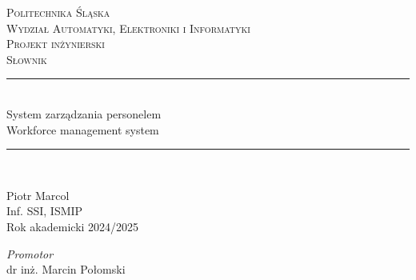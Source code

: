 \begin{titlepage} %

    \newcommand{\HRule}{\rule{\linewidth}{0.5mm}} %

    \center %


    \textsc{\LARGE Politechnika Śląska}\\[0.5cm] %

    \textsc{\Large Wydział Automatyki, Elektroniki i Informatyki}\\[1.5cm] %

    \textsc{\Large Projekt inżynierski}\\[0.5cm] %

    \textsc{\LARGE Słownik}\\[0.2cm] %


    \HRule\\[0.4cm]

    { \LARGE System zarządzania personelem \\[0.2cm]
    Workforce management system }\\[0.2cm] %

    \HRule\\[1.5cm]


    \begin{minipage}{0.5\textwidth}
        \begin{flushleft}
            Piotr Marcol\\
            Inf. SSI, ISMIP\\
            Rok akademicki 2024/2025
        \end{flushleft}
    \end{minipage}
    \begin{minipage}{0.4\textwidth}
        \begin{flushright}
            \textit{Promotor}\\
            dr inż. Marcin Połomski
        \end{flushright}
    \end{minipage}




\end{titlepage}
